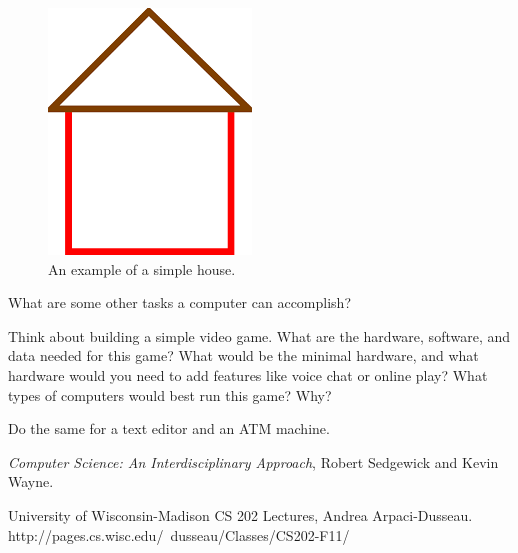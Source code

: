 \begin{figure}
  \centering
    \includegraphics[width=.32\textwidth]{lectures/images/simple_house.png}
    \caption{An example of a simple house.}
    \label{fig:house-drawing}
\end{figure}

\begin{exercise}
What are some other tasks a computer can accomplish?
\end{exercise}

\begin{exercise}
  Think about building a simple video game. What are the hardware, software, and
  data needed for this game? What would be the minimal hardware, and what
  hardware would you need to add features like voice chat or online play? What
  types of computers would best run this game? Why?

  Do the same for a text editor and an ATM machine. 
\end{exercise}



\textit{Computer Science: An Interdisciplinary Approach}, Robert Sedgewick and Kevin Wayne.

University of Wisconsin-Madison CS 202 Lectures, Andrea Arpaci-Dusseau.\\http://pages.cs.wisc.edu/~dusseau/Classes/CS202-F11/

\theendnotes
